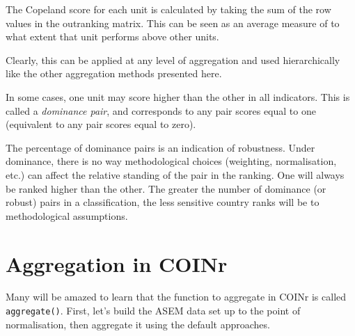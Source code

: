 \documentclass[
]{book}
\begin{document}
The Copeland score for each unit is calculated by taking the sum of the row values in the outranking matrix. This can be seen as an average measure of to what extent that unit performs above other units.

Clearly, this can be applied at any level of aggregation and used hierarchically like the other aggregation methods presented here.

In some cases, one unit may score higher than the other in all indicators. This is called a \emph{dominance pair}, and corresponds to any pair scores equal to one (equivalent to any pair scores equal to zero).

The percentage of dominance pairs is an indication of robustness. Under dominance, there is no way methodological choices (weighting, normalisation, etc.) can affect the relative standing of the pair in the ranking. One will always be ranked higher than the other. The greater the number of dominance (or robust) pairs in a classification, the less sensitive country ranks will be to methodological assumptions.

\hypertarget{aggregation-in-coinr}{%
\section{Aggregation in COINr}\label{aggregation-in-coinr}}

Many will be amazed to learn that the function to aggregate in COINr is called \texttt{aggregate()}. First, let's build the ASEM data set up to the point of normalisation, then aggregate it using the default approaches.
\end{document}
